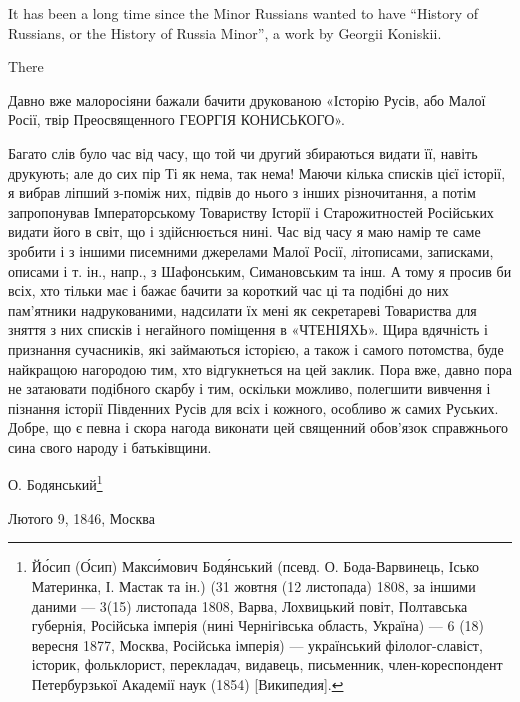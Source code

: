  
 
 
 
 

\begin{zznagolos}
\raggedcolumns
\begin{multicols}{2} %
\setlength{\parindent}{0pt}

It has been a long time since the Minor Russians wanted to have \enquote{History of
Russians, or the History of Russia Minor}, a work by Georgii Koniskii.

There 

Давно вже малоросіяни бажали бачити друкованою «Історію Русів, або Малої Росії,
твір Преосвященного ГЕОРГІЯ КОНИСЬКОГО».

Багато слів було час від часу, що той чи другий збираються видати її, навіть
друкують; але до сих пір Ті як нема, так нема! Маючи кілька списків цієї
історії, я вибрав ліпший з-поміж них, підвів до нього з інших різночитання, а
потім запропонував Імператорському Товариству Історії і Старожитностей
Російських видати його в світ, що і здійснюється нині. Час від часу я маю намір
те саме зробити і з іншими писемними джерелами Малої Росії, літописами,
записками, описами і т. ін., напр., з Шафонським, Симановським та інш.  А тому
я просив би всіх, хто тільки має і бажає бачити за короткий час ці та подібні
до них пам'ятники надрукованими, надсилати їх мені як секретареві Товариства
для зняття з них списків і негайного поміщення в «ЧТЕНІЯХЬ». Щира вдячність і
признання сучасників, які займаються історією, а також і самого потомства, буде
найкращою нагородою тим, хто відгукнеться на цей заклик. Пора вже, давно пора
не затаювати подібного скарбу і тим, оскільки можливо, полегшити вивчення і
пізнання історії Південних Русів для всіх і кожного, особливо ж самих Руських.
Добре, що є певна і скора нагода виконати цей священний обов'язок справжнього
сина свого народу і батьківщини.

О. Бодянський\footnote{%
Йо́сип (О́сип) Макси́мович Бодя́нський (псевд. О. Бода-Варвинець, Ісько
Материнка, І. Мастак та ін.) (31 жовтня (12 листопада) 1808, за іншими
даними — 3(15) листопада 1808, Варва, Лохвицький повіт, Полтавська
губернія, Російська імперія (нині Чернігівська область, Україна) — 6
(18) вересня 1877, Москва, Російська імперія) — український
філолог-славіст, історик, фольклорист, перекладач, видавець, письменник,
член-кореспондент Петербурзької Академії наук (1854) [Википедия].
}

Лютого 9, 1846, Москва

\end{multicols} %
\end{zznagolos}


